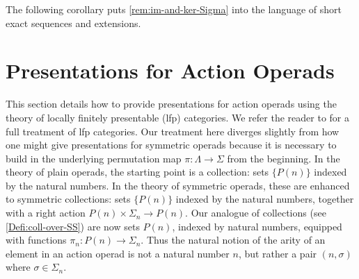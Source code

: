 The following corollary puts \cref{rem:im-and-ker-Sigma} into the language of short exact sequences and extensions.


\section{Presentations for Action Operads}\label{sec:pres-aop}

This section details how to provide presentations for action operads using the theory of locally finitely presentable (lfp) categories.
We refer the reader to \cite{ar} for a full treatment of lfp categories.
Our treatment here diverges slightly from how one might give presentations for symmetric operads because it is necessary to build in the underlying permutation map $\pi \colon \Lambda \to \Sigma$ from the beginning.
In the theory of plain operads, the starting point is a collection: sets $\{ P(n) \}$ indexed by the natural numbers.
In the theory of symmetric operads, these are enhanced to symmetric collections: sets $\{ P(n) \}$ indexed by the natural numbers, together with a right action $P(n) \times \Sigma_n \to P(n)$.
Our analogue of collections (see \cref{Defi:coll-over-SS}) are now sets $P(n)$, indexed by natural numbers, equipped with functions $\pi_n \colon P(n) \to \Sigma_n$.
Thus the natural notion of the arity of an element in an action operad is not a natural number $n$, but rather a pair $(n, \sigma)$ where $\sigma \in \Sigma_n$.


